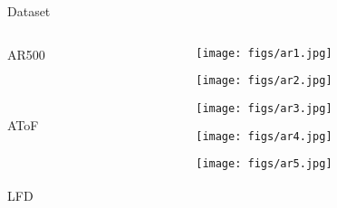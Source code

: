 \begin{frame}{Dataset}{}
    \begin{block}{}
        \vspace{-1cm}
        \begin{columns}
            \begin{column}{0.1\textwidth}
                AR500\\
                ~\\
                ~\\
                ~\\
                AToF\\
                ~\\
                ~\\
                ~\\
                LFD
            \end{column}
            \hspace{-1cm}
            \begin{column}{1\textwidth}
                \begin{figure}[H]
                    \begin{subfigure}[b]{0.1\textwidth}
                        \texttt{[image: figs/ar1.jpg]}
                    \end{subfigure}
                    \quad
                    \begin{subfigure}[b]{0.1\textwidth}
                        \texttt{[image: figs/ar2.jpg]}
                    \end{subfigure}
                    \quad
                    \begin{subfigure}[b]{0.1\textwidth}
                        \texttt{[image: figs/ar3.jpg]}
                    \end{subfigure}
                    \quad
                    \begin{subfigure}[b]{0.1\textwidth}
                        \texttt{[image: figs/ar4.jpg]}
                    \end{subfigure}
                    \quad
                    \begin{subfigure}[b]{0.1\textwidth}
                        \texttt{[image: figs/ar5.jpg]}
                    \end{subfigure}
                \end{figure}



\end{column}
\end{columns}
\end{block}
\end{frame}
